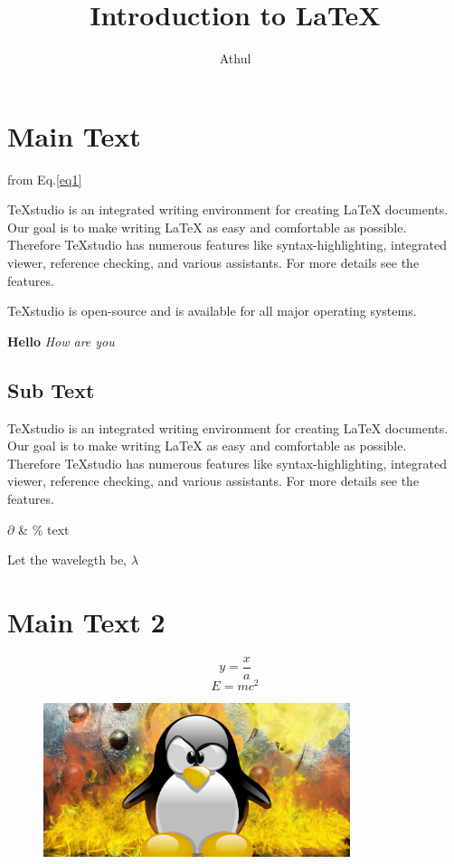 \documentclass[12pt,a4paper]{article}
\author{Athul}
\title{Introduction to LaTeX}
\begin{document}
	\maketitle
	\tableofcontents
	\newpage
	\section{Main Text}

	from Eq.\ref{eq1}
	
	TeXstudio is an integrated writing environment for creating LaTeX documents. Our goal is to make writing LaTeX as easy and comfortable as possible. Therefore TeXstudio has numerous features like syntax-highlighting, integrated viewer, reference checking, and various assistants. For more details see the features.
	
	TeXstudio is open-source and is available for all major operating systems.
	
	\textbf{Hello} \textit{How are you}
	
	\subsection{Sub Text}
	
	TeXstudio is an integrated writing environment for creating LaTeX documents. Our goal is to make writing LaTeX as easy and comfortable as possible. Therefore TeXstudio has numerous features like syntax-highlighting, integrated viewer, reference checking, and various assistants. For more details see the features.
	
$\partial$ \& \% text
	
	Let the wavelegth be, $\lambda$
	\section{Main Text 2}
	
	\begin{equation}
		y = \frac{x}{a}
	\end{equation}
\begin{equation}  \label{eq1}
	E = mc^2 
\end{equation}
	
	
	\begin{figure}[!b]
		\centering
		\includegraphics[width=0.8\textwidth]{linux.jpg}
	\end{figure}
\end{document}
